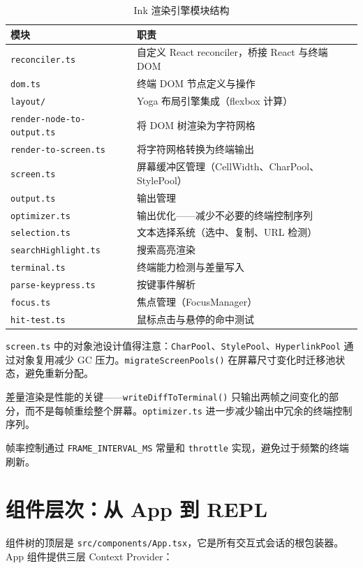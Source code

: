 \begin{table}[htbp]
\centering
\begin{tabularx}{\textwidth}{lX}
\toprule
\textbf{模块} & \textbf{职责} \\
\midrule
\texttt{reconciler.ts} & 自定义 React reconciler，桥接 React 与终端 DOM \\
\texttt{dom.ts} & 终端 DOM 节点定义与操作 \\
\texttt{layout/} & Yoga 布局引擎集成（flexbox 计算） \\
\texttt{render-node-to-output.ts} & 将 DOM 树渲染为字符网格 \\
\texttt{render-to-screen.ts} & 将字符网格转换为终端输出 \\
\texttt{screen.ts} & 屏幕缓冲区管理（CellWidth、CharPool、StylePool） \\
\texttt{output.ts} & 输出管理 \\
\texttt{optimizer.ts} & 输出优化——减少不必要的终端控制序列 \\
\texttt{selection.ts} & 文本选择系统（选中、复制、URL 检测） \\
\texttt{searchHighlight.ts} & 搜索高亮渲染 \\
\texttt{terminal.ts} & 终端能力检测与差量写入 \\
\texttt{parse-keypress.ts} & 按键事件解析 \\
\texttt{focus.ts} & 焦点管理（FocusManager） \\
\texttt{hit-test.ts} & 鼠标点击与悬停的命中测试 \\
\bottomrule
\end{tabularx}
\caption{Ink 渲染引擎模块结构}
\end{table}

\texttt{screen.ts} 中的对象池设计值得注意：\texttt{CharPool}、\texttt{StylePool}、\texttt{HyperlinkPool} 通过对象复用减少 GC 压力。\texttt{migrateScreenPools()} 在屏幕尺寸变化时迁移池状态，避免重新分配。

差量渲染是性能的关键——\texttt{writeDiffToTerminal()} 只输出两帧之间变化的部分，而不是每帧重绘整个屏幕。\texttt{optimizer.ts} 进一步减少输出中冗余的终端控制序列。

帧率控制通过 \texttt{FRAME\_INTERVAL\_MS} 常量和 \texttt{throttle} 实现，避免过于频繁的终端刷新。

\section{组件层次：从 App 到 REPL}

组件树的顶层是 \texttt{src/components/App.tsx}，它是所有交互式会话的根包装器。App 组件提供三层 Context Provider：

